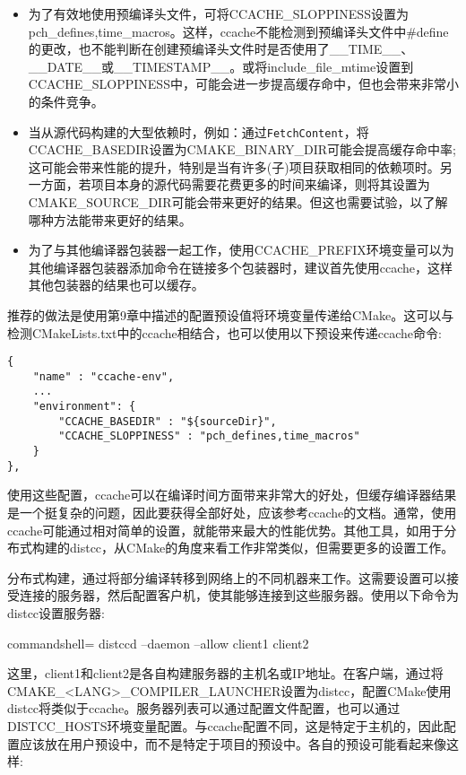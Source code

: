 \begin{itemize}
\item 
为了有效地使用预编译头文件，可将CCACHE\_SLOPPINESS设置为pch\_defines,time\_macros。这样，ccache不能检测到预编译头文件中\#define的更改，也不能判断在创建预编译头文件时是否使用了\_\_TIME\_\_、\_\_DATE\_\_或\_\_TIMESTAMP\_\_。或将include\_file\_mtime设置到CCACHE\_SLOPPINESS中，可能会进一步提高缓存命中，但也会带来非常小的条件竞争。

\item 
当从源代码构建的大型依赖时，例如：通过\texttt{FetchContent}，将CCACHE\_BASEDIR设置为CMAKE\_BINARY\_DIR可能会提高缓存命中率;这可能会带来性能的提升，特别是当有许多(子)项目获取相同的依赖项时。另一方面，若项目本身的源代码需要花费更多的时间来编译，则将其设置为CMAKE\_SOURCE\_DIR可能会带来更好的结果。但这也需要试验，以了解哪种方法能带来更好的结果。

\item 
为了与其他编译器包装器一起工作，使用CCACHE\_PREFIX环境变量可以为其他编译器包装器添加命令在链接多个包装器时，建议首先使用ccache，这样其他包装器的结果也可以缓存。
\end{itemize}

推荐的做法是使用第9章中描述的配置预设值将环境变量传递给CMake。这可以与检测CMakeLists.txt中的ccache相结合，也可以使用以下预设来传递ccache命令:

\begin{lstlisting}[style=styleCMake]
{
	"name" : "ccache-env",
	...
	"environment": {
		"CCACHE_BASEDIR" : "${sourceDir}",
		"CCACHE_SLOPPINESS" : "pch_defines,time_macros"
	}
},
\end{lstlisting}

使用这些配置，ccache可以在编译时间方面带来非常大的好处，但缓存编译器结果是一个挺复杂的问题，因此要获得全部好处，应该参考ccache的文档。通常，使用ccache可能通过相对简单的设置，就能带来最大的性能优势。其他工具，如用于分布式构建的distcc，从CMake的角度来看工作非常类似，但需要更多的设置工作。


分布式构建，通过将部分编译转移到网络上的不同机器来工作。这需要设置可以接受连接的服务器，然后配置客户机，使其能够连接到这些服务器。使用以下命令为distcc设置服务器:

\begin{tcblisting}{commandshell={}}
distccd --daemon --allow client1 client2
\end{tcblisting}

这里，client1和client2是各自构建服务器的主机名或IP地址。在客户端，通过将CMAKE\_<LANG>\_COMPILER\_LAUNCHER设置为distcc，配置CMake使用distcc将类似于ccache。服务器列表可以通过配置文件配置，也可以通过DISTCC\_HOSTS环境变量配置。与ccache配置不同，这是特定于主机的，因此配置应该放在用户预设中，而不是特定于项目的预设中。各自的预设可能看起来像这样:

